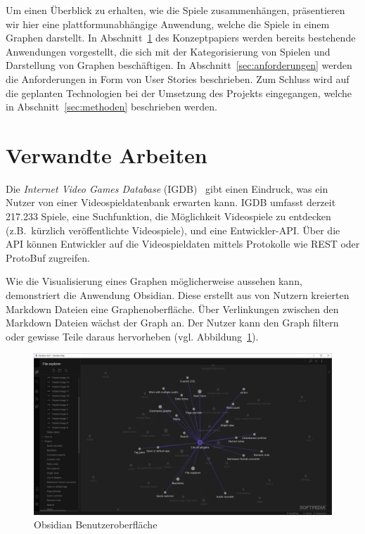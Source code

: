 \documentclass[a4paper, 10pt, conference]{IEEEtran}
\begin{document}
Um einen Überblick zu erhalten, wie die Spiele zusammenhängen, präsentieren wir hier eine plattformunabhängige Anwendung, welche die Spiele in einem Graphen darstellt. In Abschnitt~\ref{sec:verwandte_arbeiten} des Konzeptpapiers werden bereits bestehende Anwendungen vorgestellt, die sich mit der Kategorisierung von Spielen und Darstellung von Graphen beschäftigen.
In Abschnitt~\ref{sec:anforderungen} werden die Anforderungen in Form von User Stories beschrieben. Zum Schluss wird auf die geplanten Technologien bei der Umsetzung des Projekts eingegangen, welche in Abschnitt~\ref{sec:methoden} beschrieben werden.


\section{Verwandte Arbeiten}\label{sec:verwandte_arbeiten}

Die \textit{Internet Video Games Database} (IGDB)~\cite{igdb} gibt einen Eindruck, was ein Nutzer von einer Videospieldatenbank erwarten kann. IGDB umfasst derzeit 217.233 Spiele, eine Suchfunktion, die Möglichkeit Videospiele zu entdecken (z.B.\ kürzlich veröffentlichte Videospiele), und eine Entwickler-API. Über die API können Entwickler auf die Videospieldaten mittels Protokolle wie REST oder ProtoBuf zugreifen.

Wie die Visualisierung eines Graphen möglicherweise aussehen kann, demonstriert die Anwendung Obsidian. Diese erstellt aus von Nutzern kreierten Markdown Dateien eine Graphenoberfläche. Über Verlinkungen zwischen den Markdown Dateien wächst der Graph an. Der Nutzer kann den Graph filtern oder gewisse Teile daraus hervorheben (vgl. Abbildung~\ref{fig:obsidian}).

\begin{figure}[thpb]
    \centering
    \includegraphics[scale=0.17]{obsidian}
    \caption{Obsidian Benutzeroberfläche~\cite{obsidian}}
    \label{fig:obsidian}
\end{figure}
\end{document}
